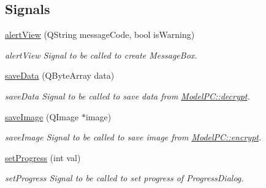 \subsection*{Signals}
\begin{DoxyCompactItemize}
\item 
\mbox{\hyperlink{class_model_p_c_aef1f058227af54e4cfc9fc4c4397d30c}{alert\+View}} (Q\+String message\+Code, bool is\+Warning)
\begin{DoxyCompactList}\small\item\em alert\+View Signal to be called to create Message\+Box. \end{DoxyCompactList}\item 
\mbox{\hyperlink{class_model_p_c_a67c4fd6db2cd4a3bb23a2fc48f7cceff}{save\+Data}} (Q\+Byte\+Array data)
\begin{DoxyCompactList}\small\item\em save\+Data Signal to be called to save data from \mbox{\hyperlink{class_model_p_c_af1f0b21565bf39808c4cdd448fad0ea8}{Model\+P\+C\+::decrypt}}. \end{DoxyCompactList}\item 
\mbox{\hyperlink{class_model_p_c_a5af79bd5fd50d7be0646778bc99413b9}{save\+Image}} (Q\+Image $\ast$image)
\begin{DoxyCompactList}\small\item\em save\+Image Signal to be called to save image from \mbox{\hyperlink{class_model_p_c_a8ef76567bc0c0307b4e2547c46536e51}{Model\+P\+C\+::encrypt}}. \end{DoxyCompactList}\item 
\mbox{\hyperlink{class_model_p_c_a25a4496e129e87ac96f12257a123b84f}{set\+Progress}} (int val)
\begin{DoxyCompactList}\small\item\em set\+Progress Signal to be called to set progress of Progress\+Dialog. \end{DoxyCompactList}\end{DoxyCompactItemize}
